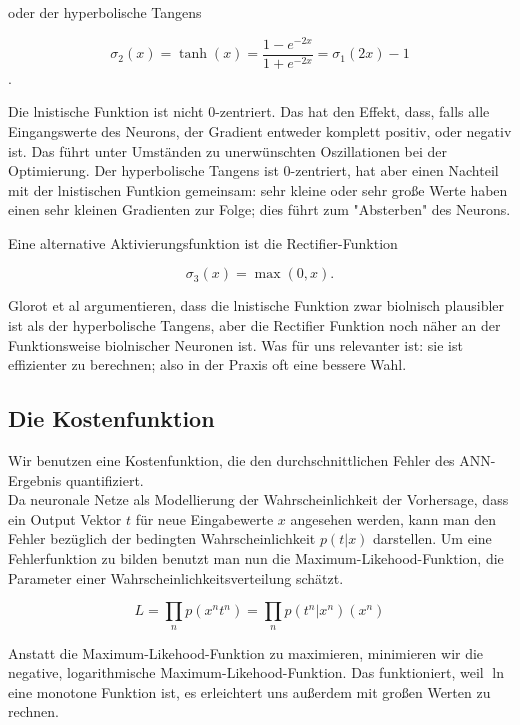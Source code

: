 oder der hyperbolische Tangens

\begin{equation}
\sigma_2(x) = \tanh(x) = \frac{1-e^{-2x}}{1+e^{-2x}} = 
\sigma_1(2x) -1
\end{equation}.

Die lnistische Funktion ist nicht 0-zentriert. Das hat den Effekt, dass, falls alle Eingangswerte des Neurons, der Gradient entweder komplett positiv, oder negativ ist. Das führt unter Umständen zu unerwünschten Oszillationen bei der Optimierung. Der hyperbolische Tangens ist 0-zentriert, hat aber einen Nachteil mit der lnistischen Funtkion gemeinsam: sehr kleine oder sehr große Werte haben einen sehr kleinen Gradienten zur Folge; dies führt zum "Absterben" des Neurons. 

Eine alternative Aktivierungsfunktion ist die Rectifier-Funktion 

\begin{equation}
\sigma_3(x) = \max(0,x).
\end{equation} 

Glorot et al argumentieren, dass die lnistische Funktion zwar biolnisch plausibler ist als der hyperbolische Tangens, aber die Rectifier Funktion noch näher an der Funktionsweise biolnischer Neuronen ist. Was für uns relevanter ist: sie ist effizienter zu berechnen; also in der Praxis oft eine bessere Wahl. \cite{glorot2011deep}


\subsection{Die Kostenfunktion}
Wir benutzen eine Kostenfunktion, die den durchschnittlichen Fehler des ANN-Ergebnis quantifiziert.\\

Da neuronale Netze als Modellierung der Wahrscheinlichkeit der Vorhersage, dass ein Output Vektor $t$ für neue Eingabewerte $x$ angesehen werden, kann man den Fehler bezüglich der bedingten Wahrscheinlichkeit $p(t|x)$ darstellen. 
Um eine Fehlerfunktion zu bilden benutzt man nun die Maximum-Likehood-Funktion, die Parameter einer Wahrscheinlichkeitsverteilung schätzt. 

\begin{equation}
L = \prod_n p(x^n t^n) = \prod_n p(t^n|x^n) (x^n) 
\end{equation}

Anstatt die Maximum-Likehood-Funktion zu maximieren, minimieren wir die negative, logarithmische Maximum-Likehood-Funktion. Das funktioniert, weil $\ln$ eine monotone Funktion ist, es erleichtert uns außerdem mit großen Werten zu rechnen.

